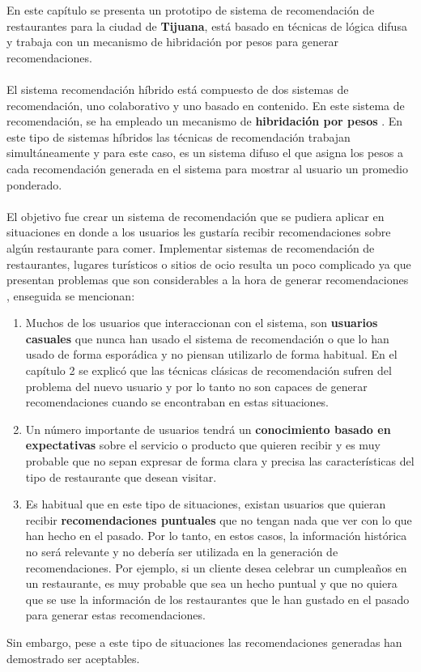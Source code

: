 \documentclass[12pt,letterpaper,oneside] {memoir}
\begin{document}
En este capítulo se presenta un prototipo de sistema de recomendación de restaurantes para la ciudad de \textbf{Tijuana}, está basado en técnicas de lógica difusa y trabaja con un mecanismo de hibridación por pesos para generar recomendaciones.
 \paragraph*{}   
El sistema  recomendación híbrido está  compuesto de dos sistemas de  recomendación, uno colaborativo y uno basado en contenido.  En este sistema de recomendación, se ha empleado  un  mecanismo de \textbf{hibridación por pesos} \citep{Burke2002}. En este tipo de sistemas híbridos las técnicas de recomendación trabajan simultáneamente y para este caso, es un sistema difuso el que asigna los pesos a cada recomendación generada en el sistema para mostrar al usuario un promedio ponderado.
\paragraph{}
El  objetivo fue crear un sistema de recomendación que se pudiera aplicar en situaciones en donde a los usuarios les gustaría recibir recomendaciones sobre algún restaurante para comer. Implementar sistemas de recomendación de restaurantes, lugares turísticos o sitios de ocio resulta un poco complicado ya que presentan problemas que son considerables a la hora de generar recomendaciones \citep{PerezCordon2008}, enseguida se mencionan:

\begin{enumerate}
\item Muchos de los usuarios que interaccionan con el sistema, son \textbf{usuarios casuales} que nunca han usado el sistema de recomendación o que lo han usado de forma esporádica y no piensan utilizarlo de forma habitual. En el capítulo 2  se explicó que las técnicas clásicas de recomendación sufren del problema del nuevo usuario y por lo tanto no son capaces de generar recomendaciones cuando se encontraban en estas situaciones.
\item Un número importante de usuarios tendrá un \textbf{conocimiento basado en expectativas} sobre el servicio o producto que quieren recibir y es muy probable que no sepan expresar de forma clara y precisa las características del tipo de restaurante que desean visitar.
\item Es habitual que en este tipo de situaciones, existan usuarios que quieran recibir \textbf{recomendaciones puntuales} que no tengan nada que ver con lo que han hecho en el pasado. Por lo tanto, en estos casos, la información histórica no será relevante y no debería ser utilizada en la generación de recomendaciones. Por ejemplo, si un cliente desea celebrar un cumpleaños en un restaurante, es muy probable que sea un hecho puntual y que no quiera que se use la información de los restaurantes que le han gustado en el pasado para generar estas recomendaciones.
\end{enumerate}
Sin embargo, pese a este tipo de situaciones las recomendaciones generadas han demostrado ser aceptables.
\end{document}
